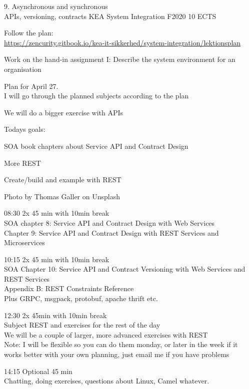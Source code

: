 \documentclass[Screen16to9,17pt]{foils}
\begin{document}
\mytitlepage
{9. Asynchronous and synchronous\\
 APIs, versioning, contracts}
{KEA System Integration F2020 10 ECTS}



\begin{list2}
\item Follow the plan:\\
\url{https://zencurity.gitbook.io/kea-it-sikkerhed/system-integration/lektionsplan}
\item Work on the hand-in assignment I: Describe the system environment for an organisation
\item Plan for April 27.\\
I will go through the planned subjects according to the plan
\item We will do a bigger exercise with APIs
\end{list2}



Todays goals:
\begin{list2}
\item SOA book chapters about Service API and Contract Design
\item More REST
\item Create/build and example with REST
\end{list2}

Photo by Thomas Galler on Unsplash


\begin{list2}
\item 08:30 2x 45 min with 10min break\\
SOA chapter 8: Service API and Contract Design
with Web Services\\
Chapter 9: Service API and Contract Design with
REST Services and Microservices

\item 10:15 2x 45 min with 10min break\\
SOA Chapter 10: Service API and Contract Versioning
with Web Services and REST Services\\
Appendix B: REST Constraints Reference\\
Plus GRPC, msgpack, protobuf, apache thrift etc.
\item 12:30 2x 45min with 10min break \\
Subject REST and exercises for the rest of the day\\
We will be a couple of larger, more advanced exercises with REST\\

Note: I will be flexible so you can do them monday, or later in the week if it works better with your own planning, just email me if you have problems \smiley
\item 14:15 Optional 45 min\\
Chatting, doing exercises, questions about Linux, Camel whatever.
\end{list2}
\end{document}

